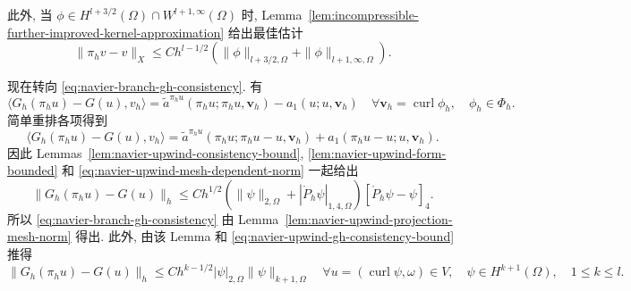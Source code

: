 此外, 当
$\phi\in H^{l+3/2}(\Omega)\cap W^{l+1,\infty}(\Omega)$ 时,
Lemma~\ref{lem:incompressible-further-improved-kernel-approximation} 给出最佳估计
\[
\|\pi_hv-v\|_X
\leq Ch^{l-1/2}
(\|\phi\|_{l+3/2,\Omega}+\|\phi\|_{l+1,\infty,\Omega}).
\]

现在转向 \eqref{eq:navier-branch-gh-consistency}. 有
\[
\langle G_h(\pi_hu)-G(u),v_h\rangle
=\widetilde a^{\pi_hu}(\pi_hu;\pi_hu,\boldsymbol v_h)
-a_1(u;u,\boldsymbol v_h)
\quad\forall\boldsymbol v_h=\operatorname{curl}\phi_h,
\quad\phi_h\in\Phi_h.
\]
简单重排各项得到
\[
\langle G_h(\pi_hu)-G(u),v_h\rangle
=\widetilde a^{\pi_hu}(\pi_hu;\pi_hu-u,\boldsymbol v_h)
+a_1(\pi_hu-u;u,\boldsymbol v_h).
\]
因此 Lemmas~\ref{lem:navier-upwind-consistency-bound},
\ref{lem:navier-upwind-form-bounded} 和
\eqref{eq:navier-upwind-mesh-dependent-norm} 一起给出
\begin{equation}\label{eq:navier-upwind-gh-consistency-bound}
\|G_h(\pi_hu)-G(u)\|_h
\leq Ch^{1/2}
(\|\psi\|_{2,\Omega}+|\mathring P_h\psi|_{1,4,\Omega})
[\mathring P_h\psi-\psi]_4.
\end{equation}
所以 \eqref{eq:navier-branch-gh-consistency} 由
Lemma~\ref{lem:navier-upwind-projection-mesh-norm} 得出. 此外, 由该 Lemma 和
\eqref{eq:navier-upwind-gh-consistency-bound} 推得
\begin{equation}\label{eq:navier-upwind-gh-consistency-rate}
\|G_h(\pi_hu)-G(u)\|_h
\leq Ch^{k-1/2}|\psi|_{2,\Omega}\|\psi\|_{k+1,\Omega}
\quad\forall u=(\operatorname{curl}\psi,\omega)\in V,
\quad\psi\in H^{k+1}(\Omega),\quad1\leq k\leq l.
\end{equation}

